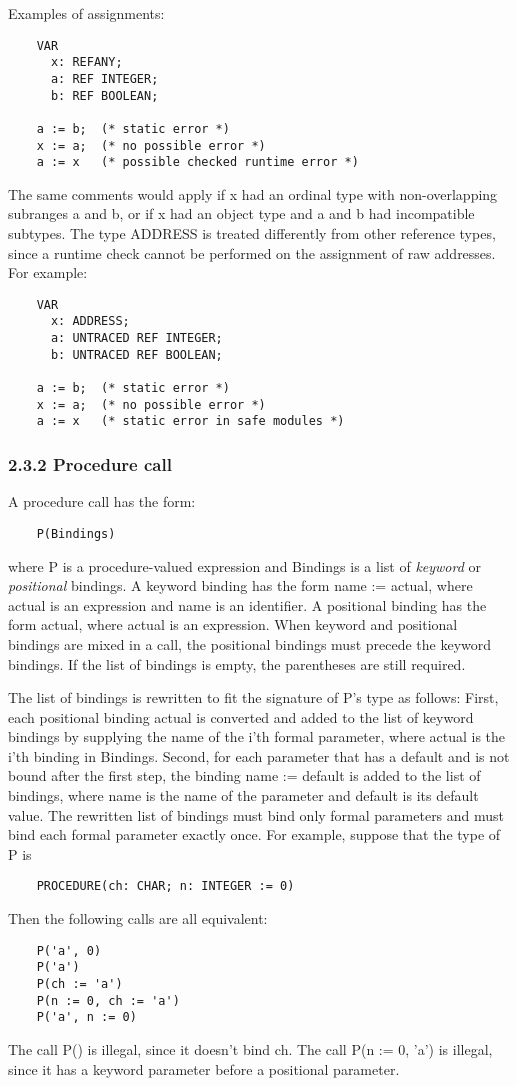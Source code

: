\documentclass[10pt]{article}
\begin{document}
Examples of assignments:
\begin{verbatim}
    VAR
      x: REFANY;
      a: REF INTEGER;
      b: REF BOOLEAN;

    a := b;  (* static error *)
    x := a;  (* no possible error *)
    a := x   (* possible checked runtime error *)
\end{verbatim}

The same comments would apply if x had an ordinal type with non-overlapping subranges a and b, or if x had an object type and a and b had incompatible subtypes. The type ADDRESS is treated differently from other reference types, since a runtime check cannot be performed on the assignment of raw addresses. For example:
\begin{verbatim}
    VAR
      x: ADDRESS;
      a: UNTRACED REF INTEGER;
      b: UNTRACED REF BOOLEAN;

    a := b;  (* static error *)
    x := a;  (* no possible error *)
    a := x   (* static error in safe modules *)
\end{verbatim}

\subsubsection*{2.3.2 Procedure call}

A procedure call has the form:
\begin{verbatim}
    P(Bindings)
\end{verbatim}
where P is a procedure-valued expression and Bindings is a list of
\emph{keyword} or \emph{positional} bindings. A keyword binding has the form
name := actual, where actual is an expression and name is an identifier. A
positional binding has the form actual, where actual is an expression. When
keyword and positional bindings are mixed in a call, the positional bindings
must precede the keyword bindings. If the list of bindings is empty, the
parentheses are still required.

The list of bindings is rewritten to fit the signature of P's type as follows:
First, each positional binding actual is converted and added to the list of
keyword bindings by supplying the name of the i'th formal parameter, where
actual is the i'th binding in Bindings. Second, for each parameter that has a
default and is not bound after the first step, the binding name := default is
added to the list of bindings, where name is the name of the parameter and
default is its default value. The rewritten list of bindings must bind only
formal parameters and must bind each formal parameter exactly once. For
example, suppose that the type of P is
\begin{verbatim}
    PROCEDURE(ch: CHAR; n: INTEGER := 0)
\end{verbatim}
Then the following calls are all equivalent:
\begin{verbatim}
    P('a', 0)
    P('a')
    P(ch := 'a')
    P(n := 0, ch := 'a')
    P('a', n := 0)
\end{verbatim}
The call P() is illegal, since it doesn't bind ch. The call P(n := 0, 'a') is
illegal, since it has a keyword parameter before a positional parameter.
\end{document}
